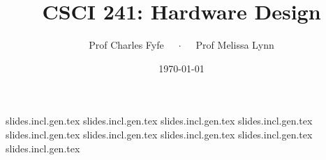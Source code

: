 \documentclass{beamer}
\title{CSCI 241: Hardware Design}
\date{\today}
\author{Prof Charles Fyfe $\quad \cdot \quad$ Prof Melissa Lynn}
\institute{St Olaf College}
\begin{document}
\titlepage

\TOC{}

{slides.incl.gen.tex}
{slides.incl.gen.tex}
{slides.incl.gen.tex}
{slides.incl.gen.tex}
{slides.incl.gen.tex}
{slides.incl.gen.tex}
{slides.incl.gen.tex}
{slides.incl.gen.tex}
{slides.incl.gen.tex}

% 
\end{document}
